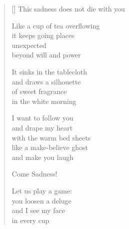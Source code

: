 \documentclass[11pt,a4paper]{article}
\begin{document}
\thispagestyle{empty}

\poemtitle{}

\settowidth{\versewidth}{This sadness does not die with you}

\bigskip

\begin{verse}[\versewidth]
This sadness does not die with you

Like a cup of tea overflowing\\
it keeps going places\\
unexpected\\
beyond will and power

It sinks in the tablecloth\\
and draws a silhouette\\
of sweet fragrance\\
in the white morning

I want to follow you\\
and drape my heart\\
with the warm bed sheets\\
like a make-believe ghost\\
and make you laugh

Come Sadness!

Let us play a game:\\
you loosen a deluge\\
and I see my face\\
in every cup
\end{verse}
\end{document}
